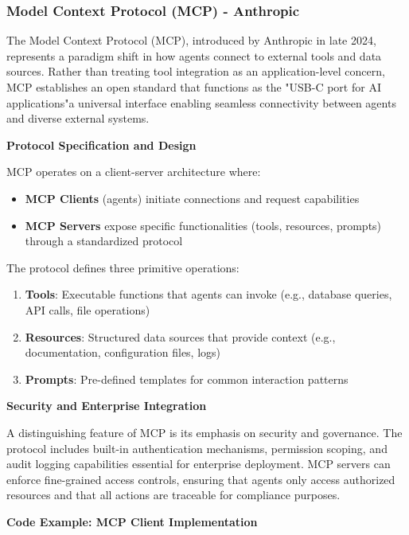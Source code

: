 \subsubsection{Model Context Protocol (MCP) - Anthropic}

The Model Context Protocol (MCP), introduced by Anthropic in late 2024, represents a paradigm shift in how agents connect to external tools and data sources. Rather than treating tool integration as an application-level concern, MCP establishes an open standard that functions as the "USB-C port for AI applications"a universal interface enabling seamless connectivity between agents and diverse external systems.

\textbf{Protocol Specification and Design}

MCP operates on a client-server architecture where:
\begin{itemize}
    \item \textbf{MCP Clients} (agents) initiate connections and request capabilities
    \item \textbf{MCP Servers} expose specific functionalities (tools, resources, prompts) through a standardized protocol

\end{itemize}
The protocol defines three primitive operations:

\begin{enumerate}
    \item \textbf{Tools}: Executable functions that agents can invoke (e.g., database queries, API calls, file operations)
    \item \textbf{Resources}: Structured data sources that provide context (e.g., documentation, configuration files, logs)
    \item \textbf{Prompts}: Pre-defined templates for common interaction patterns

\end{enumerate}
\textbf{Security and Enterprise Integration}

A distinguishing feature of MCP is its emphasis on security and governance. The protocol includes built-in authentication mechanisms, permission scoping, and audit logging capabilities essential for enterprise deployment. MCP servers can enforce fine-grained access controls, ensuring that agents only access authorized resources and that all actions are traceable for compliance purposes.

\textbf{Code Example: MCP Client Implementation}

